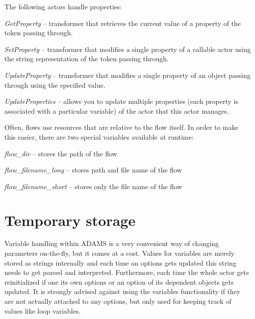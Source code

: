 The following actors handle properties:
\begin{tight_itemize}
	\item \textit{GetProperty} -- transformer that retrieves the current
	value of a property of the token passing through.
	\item \textit{SetProperty} -- transformer that modifies a single property of a
	callable actor using the string representation of the token passing through.
	\item \textit{UpdateProperty} -- transformer that modifies a single property
	of an object passing through using the specified value.
	\item \textit{UpdateProperties} -- allows you to update multiple properties
	(each property is associated with a particular variable) of the actor that
	this actor manages.
\end{tight_itemize}

Often, flows use resources that are relative to the flow itself. In order to
make this easier, there are two special variables available at runtime:
\begin{tight_itemize}
	\item \textit{flow\_dir} -- stores the path of the flow
	\item \textit{flow\_filename\_long} -- stores path and file name of the flow
	\item \textit{flow\_filename\_short} -- stores only the file name of the flow
\end{tight_itemize}

\newpage
\section{Temporary storage}
\label{temporary_storage}
Variable handling within ADAMS is a very convenient way of changing parameters
on-the-fly, but it comes at a cost. Values for variables are merely stored as
strings internally and each time an options gets updated this string needs to
get parsed and interpreted. Furthermore, each time the whole actor gets
reinitialized if one its own options or an option of its dependent objects gets
updated. It is strongly advised against using the variables functionality if
they are not actually attached to any options, but only used for keeping track
of values like loop variables.

